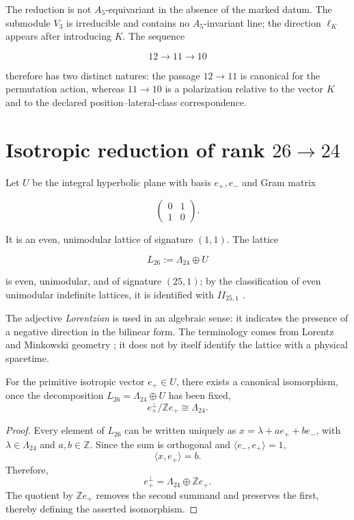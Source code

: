The reduction is not \(A_5\)-equivariant in the absence of the marked datum. The
submodule \(V_3\) is irreducible and contains no \(A_5\)-invariant line;
the direction \(\ell_K\) appears after introducing \(K\). The sequence

\[
12\longrightarrow11\longrightarrow10
\]

therefore has two distinct natures: the passage \(12\to11\) is canonical for
the permutation action, whereas \(11\to10\) is a polarization
relative to the vector \(K\) and to the declared position--lateral-class correspondence.

\section{Isotropic reduction of rank \(26\to24\)}
\label{sec:reduccion-26-24}

Let \(U\) be the integral hyperbolic plane with basis \(e_+,e_-\) and Gram matrix

\[
\begin{pmatrix}0&1\\1&0\end{pmatrix}.
\]

It is an even, unimodular lattice of signature \((1,1)\). The lattice

\[
L_{26}:=\Lambda_{24}\oplus U
\]

is even, unimodular, and of signature \((25,1)\); by the classification of even
unimodular indefinite lattices, it is identified with \(II_{25,1}\)
\cite{ConwaySloane1999}.

The adjective \emph{Lorentzian} is used in an algebraic sense: it indicates the
presence of a negative direction in the bilinear form. The terminology
comes from Lorentz and Minkowski geometry
\cite{Lorentz1904,Minkowski1909}; it does not by itself identify the lattice with
a physical spacetime.

\begin{theorem}
\label{thm:reduccion-nula}
For the primitive isotropic vector \(e_+\in U\), there exists a canonical
isomorphism, once the decomposition \(L_{26}=\Lambda_{24}\oplus U\) has been fixed,
\[
e_+^\perp/\mathbb Ze_+\cong\Lambda_{24}.
\]
\end{theorem}

\begin{proof}
Every element of \(L_{26}\) can be written uniquely as
\(x=\lambda+ae_++be_-\), with
\(\lambda\in\Lambda_{24}\) and \(a,b\in\mathbb Z\). Since the sum is
orthogonal and \(\langle e_-,e_+\rangle=1\),
\[
\langle x,e_+\rangle=b.
\]
Therefore,
\[
e_+^\perp=\Lambda_{24}\oplus\mathbb Ze_+.
\]
The quotient by \(\mathbb Ze_+\) removes the second summand and preserves the
first, thereby defining the asserted isomorphism.
\end{proof}

